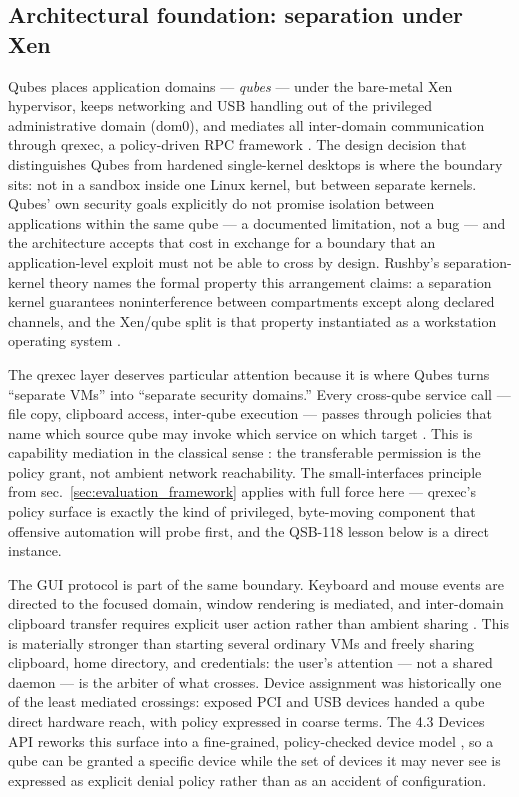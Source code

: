 \documentclass[
  english,
  9pt,
]{extarticle}
\begin{document}
\subsection{Architectural foundation: separation under
Xen}\label{architectural-foundation-separation-under-xen}

Qubes places application domains --- \emph{qubes} --- under the
bare-metal Xen hypervisor, keeps networking and USB handling out of the
privileged administrative domain (dom0), and mediates all inter-domain
communication through qrexec, a policy-driven RPC framework
\citep{qubes_architecture, qubes_qrexec}. The design decision that
distinguishes Qubes from hardened single-kernel desktops is where the
boundary sits: not in a sandbox inside one Linux kernel, but between
separate kernels. Qubes' own security goals explicitly do not promise
isolation between applications within the same qube
\citep{qubes_security_design_goals} --- a documented limitation, not a
bug --- and the architecture accepts that cost in exchange for a
boundary that an application-level exploit must not be able to cross by
design. Rushby's separation-kernel theory names the formal property this
arrangement claims: a separation kernel guarantees noninterference
between compartments except along declared channels, and the Xen/qube
split is that property instantiated as a workstation operating system
\citep{rushby1981}.

The qrexec layer deserves particular attention because it is where Qubes
turns ``separate VMs'' into ``separate security domains.'' Every
cross-qube service call --- file copy, clipboard access, inter-qube
execution --- passes through policies that name which source qube may
invoke which service on which target \citep{qubes_qrexec}. This is
capability mediation in the classical sense \citep{levy1984, hardy1988}:
the transferable permission is the policy grant, not ambient network
reachability. The small-interfaces principle from
sec.~\ref{sec:evaluation_framework} applies with full force here ---
qrexec's policy surface is exactly the kind of privileged, byte-moving
component that offensive automation will probe first, and the QSB-118
lesson below is a direct instance.

The GUI protocol is part of the same boundary. Keyboard and mouse events
are directed to the focused domain, window rendering is mediated, and
inter-domain clipboard transfer requires explicit user action rather
than ambient sharing \citep{qubes_gui_protocol}. This is materially
stronger than starting several ordinary VMs and freely sharing
clipboard, home directory, and credentials: the user's attention --- not
a shared daemon --- is the arbiter of what crosses. Device assignment
was historically one of the least mediated crossings: exposed PCI and
USB devices handed a qube direct hardware reach, with policy expressed
in coarse terms. The 4.3 Devices API reworks this surface into a
fine-grained, policy-checked device model \citep{qubes_devices_api}, so
a qube can be granted a specific device while the set of devices it may
never see is expressed as explicit denial policy rather than as an
accident of configuration.
\end{document}
